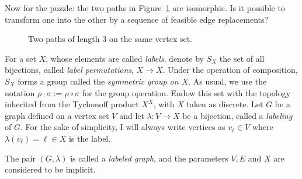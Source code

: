 Now for the puzzle: the two paths in Figure~\ref{fig:4_paths} are isomorphic.
Is it possible to transform one into the other by a sequence of feasible edge replacements?

\begin{figure}[htbp]
\centering
\begin{subfigure}[b]{0.4\textwidth}
    \centering
\end{subfigure}
\hfill
\begin{subfigure}[b]{0.4\textwidth}
    \centering
\end{subfigure}
\caption{Two paths of length $3$ on the same vertex set.}
\label{fig:4_paths}
\end{figure}

\begin{definition}\label{def:labeled-graph}
    For a set $X$, whose elements are called \emph{labels}, denote by $S_X$ the set of all bijections, called \emph{label permutations}, $X\to X$.
    Under the operation of composition, $S_X$ forms a group called the \emph{symmetric group on $X$}.
    As usual, we use the notation $\rho\cdot\sigma:=\rho\circ\sigma$ for the group operation.
    Endow this set with the topology inherited from the Tychonoff product $X^X$, with $X$ taken as discrete.
    Let $G$ be a graph defined on a vertex set $V$ and let $\lambda\colon V\to X$ be a bijection, called a \emph{labeling} of $G$.
    For the sake of simplicity, I will always write vertices as $v_\ell\in V$ where $\lambda(v_\ell)=\ell\in X$ is the label.

    The pair $(G,\lambda)$ is called a \emph{labeled graph}, and the parameters $V,E$ and $X$ are considered to be implicit.
\end{definition}


